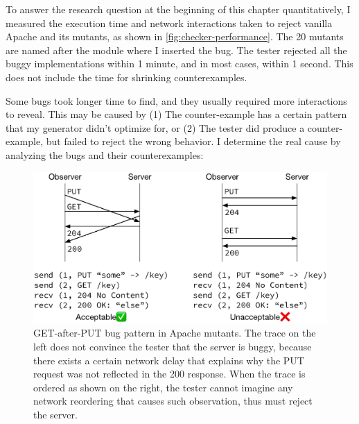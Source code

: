 To answer the research question at the beginning of this chapter quantitatively,
I measured the execution time and network interactions taken to reject vanilla
Apache and its mutants, as shown in \autoref{fig:checker-performance}.  The 20
mutants are named after the module where I inserted the bug.  The tester
rejected all the buggy implementations within 1 minute, and in most cases,
within 1 second.  This does not include the time for shrinking counterexamples.

Some bugs took longer time to find, and they usually required more interactions
to reveal.  This may be caused by (1) The counter-example has a certain pattern
that my generator didn't optimize for, or (2) The tester did produce a
counter-example, but failed to reject the wrong behavior.  I determine the real
cause by analyzing the bugs and their counterexamples:

\begin{figure}
  \includegraphics[width=\linewidth]{figures/http-put-bug}
  \caption[GET-after-PUT bug pattern in Apache mutants.]{GET-after-PUT bug
    pattern in Apache mutants.  The trace on the left does not convince the
    tester that the server is buggy, because there exists a certain network
    delay that explains why the PUT request was not reflected in the 200
    response.  When the trace is ordered as shown on the right, the tester
    cannot imagine any network reordering that causes such observation, thus
    must reject the server.}
  \label{fig:put-bug}
\end{figure}
  
